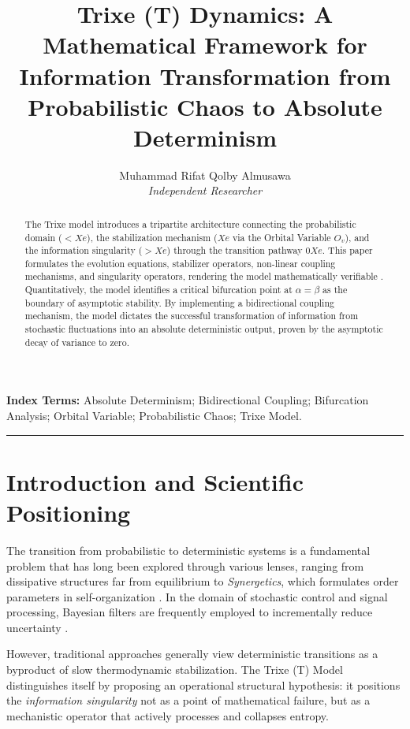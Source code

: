 \documentclass[12pt, a4paper]{article}
\title{Trixe (T) Dynamics: A Mathematical Framework for Information Transformation from Probabilistic Chaos to Absolute Determinism}
\author{Muhammad Rifat Qolby Almusawa \\ \small \textit{Independent Researcher}}
\date{}
\begin{document}
\maketitle

\begin{abstract}
The Trixe model introduces a tripartite architecture connecting the probabilistic domain ($<Xe$), the stabilization mechanism ($Xe$ via the Orbital Variable $O_v$), and the information singularity ($>Xe$) through the transition pathway $0Xe$. This paper formulates the evolution equations, stabilizer operators, non-linear coupling mechanisms, and singularity operators, rendering the model mathematically verifiable \cite{strogatz1994, shannon1948}. Quantitatively, the model identifies a critical bifurcation point at $\alpha=\beta$ as the boundary of asymptotic stability. By implementing a bidirectional coupling mechanism, the model dictates the successful transformation of information from stochastic fluctuations into an absolute deterministic output, proven by the asymptotic decay of variance to zero.
\end{abstract}

\textbf{Index Terms:} Absolute Determinism; Bidirectional Coupling; Bifurcation Analysis; Orbital Variable; Probabilistic Chaos; Trixe Model.

\vspace{1em}
\hrule
\vspace{1em}

\section{Introduction and Scientific Positioning}
The transition from probabilistic to deterministic systems is a fundamental problem that has long been explored through various lenses, ranging from dissipative structures far from equilibrium \cite{prigogine1977} to \textit{Synergetics}, which formulates order parameters in self-organization \cite{haken1983}. In the domain of stochastic control and signal processing, Bayesian filters are frequently employed to incrementally reduce uncertainty \cite{jazwinski1970}. 

However, traditional approaches generally view deterministic transitions as a byproduct of slow thermodynamic stabilization. The Trixe (T) Model distinguishes itself by proposing an operational structural hypothesis: it positions the \textit{information singularity} not as a point of mathematical failure, but as a mechanistic operator that actively processes and collapses entropy. 
\end{document}
